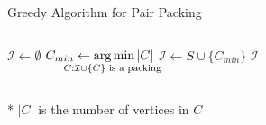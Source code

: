 \begin{frame}{Greedy Algorithm for Pair Packing}
\begin{columns}[T]

\begin{column}{.5\linewidth}


\begin{algorithm}[H]
\caption{Greedy Algorithm}
\begin{algorithmic}[1]
\STATE $\mathcal{I} \gets \emptyset$
\STATE
$C_{min} \gets \smashoperator{\argmin\limits_{C : \mathcal{I} \cup \{C\} \text{ is a packing }}}|C|$
\STATE $\mathcal{I} \gets S \cup \{ C_{min} \}$
\ENDWHILE
\RETURN $\mathcal{I}$
\end{algorithmic}
\end{algorithm}

\end{column}\hfill\begin{column}{.5\linewidth}

\addtocounter{algorithm}{-1}


\end{column}\end{columns}
\vfill
* $|C|$ is the number of vertices in $C$
\end{frame}